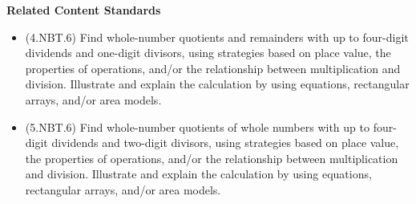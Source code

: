 \documentclass[
]{book}
\providecommand{\tightlist}{%
  \setlength{\itemsep}{0pt}\setlength{\parskip}{0pt}}
\newenvironment{standards}{}{}
\theoremstyle{definition}
\theoremstyle{definition}
\theoremstyle{definition}
\theoremstyle{definition}
\theoremstyle{remark}
\begin{document}
\begin{standards}

\begin{center}
\textbf{Related Content Standards}

\end{center}

\begin{itemize}
\tightlist
\item
  (4.NBT.6) Find whole-number quotients and remainders with up to four-digit dividends and one-digit divisors, using strategies based on place value, the properties of operations, and/or the relationship between multiplication and division. Illustrate and explain the calculation by using equations, rectangular arrays, and/or area models.
\item
  (5.NBT.6) Find whole-number quotients of whole numbers with up to four-digit dividends and two-digit divisors, using strategies based on place value, the properties of operations, and/or the relationship between multiplication and division. Illustrate and explain the calculation by using equations, rectangular arrays, and/or area models.
\end{itemize}

\end{standards}
\end{document}
